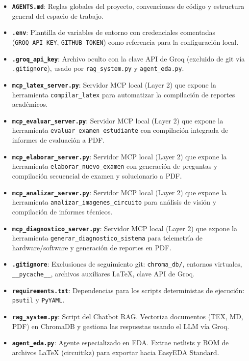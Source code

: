 \documentclass[12pt,a4paper]{article}
\begin{document}
\begin{itemize}
    \item \textbf{\texttt{AGENTS.md}}: Reglas globales del proyecto, convenciones de código y estructura general del espacio de trabajo.
    \item \textbf{\texttt{.env}}: Plantilla de variables de entorno con credenciales comentadas (\texttt{GROQ\_API\_KEY}, \texttt{GITHUB\_TOKEN}) como referencia para la configuración local.
    \item \textbf{\texttt{.groq\_api\_key}}: Archivo oculto con la clave API de Groq (excluido de git vía \texttt{.gitignore}), usado por \texttt{rag\_system.py} y \texttt{agent\_eda.py}.
    \item \textbf{\texttt{mcp\_latex\_server.py}}: Servidor MCP local (Layer 2) que expone la herramienta \texttt{compilar\_latex} para automatizar la compilación de reportes académicos.
    \item \textbf{\texttt{mcp\_evaluar\_server.py}}: Servidor MCP local (Layer 2) que expone la herramienta \texttt{evaluar\_examen\_estudiante} con compilación integrada de informes de evaluación a PDF.
    \item \textbf{\texttt{mcp\_elaborar\_server.py}}: Servidor MCP local (Layer 2) que expone la herramienta \texttt{elaborar\_nuevo\_examen} con generación de preguntas y compilación secuencial de examen y solucionario a PDF.
    \item \textbf{\texttt{mcp\_analizar\_server.py}}: Servidor MCP local (Layer 2) que expone la herramienta \texttt{analizar\_imagenes\_circuito} para análisis de visión y compilación de informes técnicos.
    \item \textbf{\texttt{mcp\_diagnostico\_server.py}}: Servidor MCP local (Layer 2) que expone la herramienta \texttt{generar\_diagnostico\_sistema} para telemetría de hardware/software y generación de reportes en PDF.
    \item \textbf{\texttt{.gitignore}}: Exclusiones de seguimiento git: \texttt{chroma\_db/}, entornos virtuales, \texttt{\_\_pycache\_\_}, archivos auxiliares LaTeX, clave API de Groq.
    \item \textbf{\texttt{requirements.txt}}: Dependencias para los scripts deterministas de ejecución: \texttt{psutil} y \texttt{PyYAML}.
    \item \textbf{\texttt{rag\_system.py}}: Script del Chatbot RAG. Vectoriza documentos (TEX, MD, PDF) en ChromaDB y gestiona las respuestas usando el LLM vía Groq.
    \item \textbf{\texttt{agent\_eda.py}}: Agente especializado en EDA. Extrae netlists y BOM de archivos LaTeX (circuitikz) para exportar hacia EasyEDA Standard.

\end{itemize}
\end{document}
